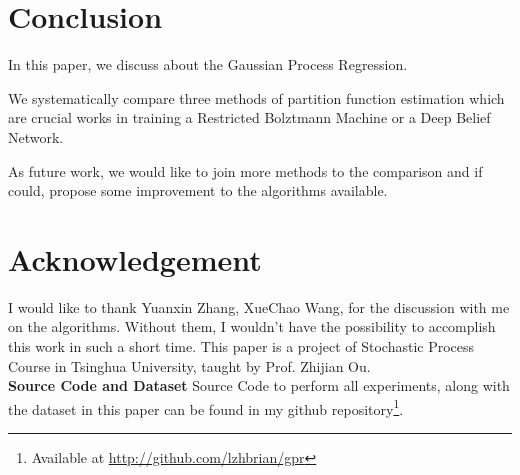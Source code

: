 \documentclass{sig-alternate-05-2015}
\newcommand{\para}[1]{{\vspace{2pt} \bf \noindent #1 \hspace{8pt}}}
\begin{document}







\section{} \label{sec:}

\section{} \label{sec:}


\section{Conclusion} \label{sec:conclusion}
In this paper, we discuss about the Gaussian Process Regression.

We systematically compare three methods of partition function estimation which are crucial works in training a Restricted Bolztmann Machine or a Deep Belief Network. 

As future work, we would like to join more methods to the comparison and if could, propose some improvement to the algorithms available.




\renewcommand{\baselinestretch}{1.1}
\balance
\section{Acknowledgement} \label{sec:acknowledgement}
I would like to thank Yuanxin Zhang, XueChao Wang, for the discussion with me on the algorithms. Without them, I wouldn't have the possibility to accomplish this work in such a short time. This paper is a project of Stochastic Process Course in Tsinghua University, taught by Prof. Zhijian Ou.\\


\para{Source Code and Dataset} Source Code to perform all experiments, along with the dataset in this paper can be found in my github repository\footnote{Available at \color{blue}\href{http://github.com/lzhbrian/gpr}{http://github.com/lzhbrian/gpr}}.


\newpage


\end{document}
